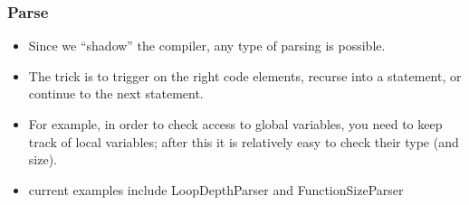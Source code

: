 \documentclass[10pt]{beamer}
\begin{document}
\begin{frame}[t]
\frametitle{Parse}
\begin{itemize}
\item Since we ``shadow'' the compiler, any type of parsing is possible.
\item The trick is to trigger on the right code elements, recurse into a statement, or continue to the next statement.
\item For example, in order to check access to global variables, you need to keep track of local variables; after this it is relatively easy to check their type (and size).
\item current examples include LoopDepthParser and FunctionSizeParser
\end{itemize}


\end{frame}
\end{document}
